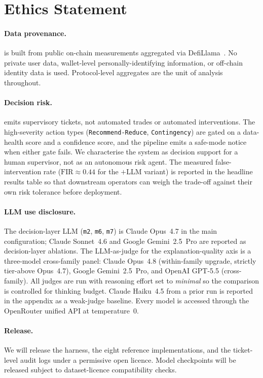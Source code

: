 \section*{Ethics Statement}
\label{sec:ethics}

\paragraph{Data provenance.}
\corpusname{} is built from public on-chain measurements
aggregated via DefiLlama~\citep{DefiLlama2026}. No private user data,
wallet-level personally-identifying information, or off-chain
identity data is used. Protocol-level aggregates are the unit of
analysis throughout.

\paragraph{Decision risk.}
\sysname{} emits supervisory tickets, not automated trades or
automated interventions. The high-severity action types
(\texttt{Recommend-Reduce}, \texttt{Contingency}) are gated on a
data-health score and a confidence score, and the pipeline emits a
safe-mode notice when either gate fails. We characterise the system
as decision support for a human supervisor, not as an autonomous
risk agent. The measured false-intervention rate
($\mathrm{FIR}\!\approx\!0.44$ for the \fmname$+$LLM variant) is
reported in the headline results table so that downstream operators
can weigh the trade-off against their own risk tolerance before
deployment.

\paragraph{LLM use disclosure.}
The decision-layer LLM (\texttt{m2}, \texttt{m6}, \texttt{m7}) is
Claude Opus~4.7 in the main configuration; Claude Sonnet~4.6 and
Google Gemini~2.5~Pro are reported as decision-layer ablations.
The LLM-as-judge for the explanation-quality axis is a
three-model cross-family panel: Claude Opus~4.8 (within-family
upgrade, strictly tier-above Opus~4.7), Google Gemini~2.5~Pro,
and OpenAI GPT-5.5 (cross-family). All judges are run with
reasoning effort set to \emph{minimal} so the comparison is
controlled for thinking budget. Claude Haiku~4.5 from a prior
run is reported in the appendix as a weak-judge baseline. Every
model is accessed through the OpenRouter unified API at
temperature~$0$.

\paragraph{Release.}
We will release the harness, the eight reference implementations,
and the ticket-level audit logs under a permissive open licence.
Model checkpoints will be released subject to dataset-licence
compatibility checks.
